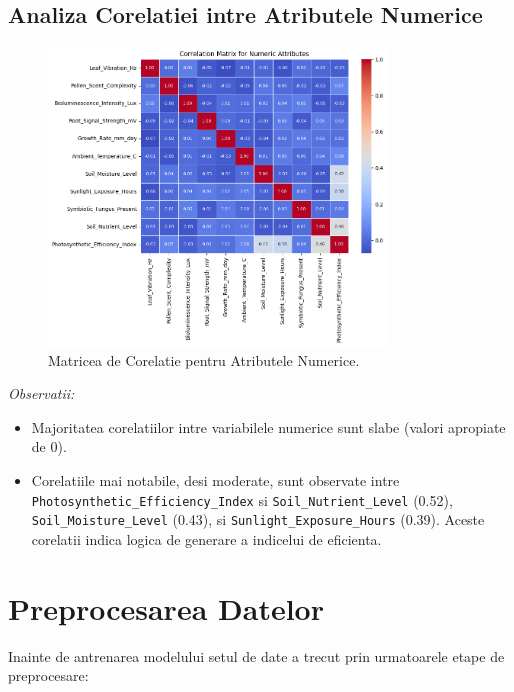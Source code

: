 \documentclass[11pt, a4paper]{article}
\begin{document}
\subsection{Analiza Corelatiei intre Atributele Numerice}
\begin{figure}[H]
    \centering
    \includegraphics[width=0.8\textwidth]{correlation.png} %
    \caption{Matricea de Corelatie pentru Atributele Numerice.}
    \label{fig:correlation_matrix}
\end{figure}

\textit{Observatii:}
\sloppy
\begin{itemize}[noitemsep, topsep=1pt]
    \item Majoritatea corelatiilor intre variabilele numerice sunt slabe (valori apropiate de 0).
    \item Corelatiile mai notabile, desi moderate, sunt observate intre \texttt{Photosynthetic\_Efficiency\_Index} si \texttt{Soil\_Nutrient\_Level} (0.52), \texttt{Soil\_Moisture\_Level} (0.43), si \texttt{Sunlight\_Exposure\_Hours} (0.39). Aceste corelatii indica logica de generare a indicelui de eficienta.
\end{itemize}

\section{Preprocesarea Datelor}
Inainte de antrenarea modelului setul de date a trecut prin urmatoarele etape de preprocesare:
\end{document}
